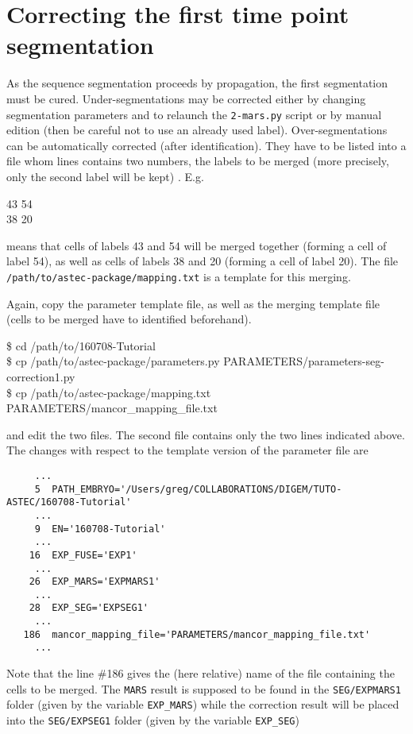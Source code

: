 \section{Correcting the first time point segmentation}

As the sequence segmentation proceeds by propagation, the first segmentation must be cured. Under-segmentations may be corrected either by changing segmentation parameters and to relaunch the \texttt{2-mars.py}  script or by manual edition (then be careful not to use an already used label). Over-segmentations can be automatically corrected (after identification). They have to be listed into a file whom lines contains two numbers, the labels to be merged (more precisely, only the second label will be kept) . E.g.
\begin{code}{0.8}
43 54\\
38 20
\end{code}
means that cells of labels 43 and 54 will be merged together (forming a cell of label 54), as well as cells of labels 38 and 20 (forming a cell of label 20).
The file \texttt{/path/to/astec-package/mapping.txt} is a template for this merging.


Again, copy the parameter template file, as well as the merging template file (cells to be merged have to identified beforehand).

\begin{code}{0.8}
\$ cd /path/to/160708-Tutorial\\
\$ cp /path/to/astec-package/parameters.py PARAMETERS/parameters-seg-correction1.py \\
\$ cp /path/to/astec-package/mapping.txt PARAMETERS/mancor\_mapping\_file.txt
\end{code}

and edit the two files. The second file contains only the two lines indicated above.
The changes with respect to the template version of the parameter file are

\begin{verbatim}
     ...
     5	PATH_EMBRYO='/Users/greg/COLLABORATIONS/DIGEM/TUTO-ASTEC/160708-Tutorial'	
     ...
     9	EN='160708-Tutorial'			
     ... 
    16	EXP_FUSE='EXP1'	
     ...
    26	EXP_MARS='EXPMARS1'		
     ...
    28	EXP_SEG='EXPSEG1'
     ...
   186	mancor_mapping_file='PARAMETERS/mancor_mapping_file.txt' 
     ...
\end{verbatim}

Note that the line \#186 gives the (here relative) name of the file containing the cells to be merged. The \texttt{MARS} result is supposed to be found in the \texttt{SEG/EXPMARS1} folder (given by the variable \texttt{EXP\_MARS})  while the correction result will be placed into the \texttt{SEG/EXPSEG1} folder (given by the variable \texttt{EXP\_SEG})


